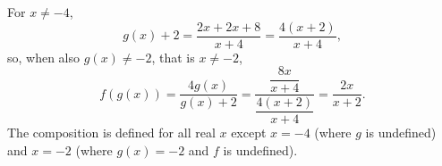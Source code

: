 For $x\ne-4$,
\[
g(x)+2=\dfrac{2x+2x+8}{x+4}=\dfrac{4(x+2)}{x+4},
\]
so, when also $g(x)\ne-2$, that is $x\ne-2$,
\[
f(g(x))=\dfrac{4g(x)}{g(x)+2}=\dfrac{\dfrac{8x}{x+4}}{\dfrac{4(x+2)}{x+4}}=\boxed{\dfrac{2x}{x+2}} .
\]
The composition is defined for all real $x$ except $x=-4$ (where $g$ is undefined) and $x=-2$ (where $g(x)=-2$ and $f$ is undefined).
